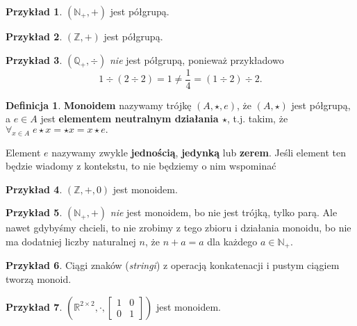 \documentclass{article}
\theoremstyle{definition}
\newtheorem{definition}{Definicja}[section]
\newtheorem{example}{Przykład}[section]
\begin{document}
\begin{example}
	$(\mathbb{N}_+, +)$ jest półgrupą.
\end{example}

\begin{example}
	$(\mathbb{Z}, +)$ jest półgrupą.
\end{example}

\begin{example}
	$(\mathbb{Q}_+, \div)$ \textit{nie} jest półgrupą, ponieważ przykładowo
	\begin{equation*}
		1 \div (2 \div 2) = 1 \neq \frac{1}{4} = (1\div2)\div2.
	\end{equation*}
\end{example}


\begin{definition}
	\textbf{Monoidem} nazywamy trójkę $(A, \star, e)$, że $(A, \star)$ jest półgrupą, a $e\in A$ jest \textbf{elementem neutralnym działania $\star$}, t.j. takim, że
	\begin{math}
		\forall_{x \in A}\; e \star x = \star x = x \star e.
	\end{math}
\end{definition}

Element $e$ nazywamy zwykle \textbf{jednością}, \textbf{jedynką} lub \textbf{zerem}.
Jeśli element ten będzie wiadomy z kontekstu,
	to nie będziemy o nim wspominać

\begin{example}
	$(\mathbb{Z}, +, 0)$ jest monoidem.
\end{example}

\begin{example}
	$(\mathbb{N}_+, +)$ \textit{nie} jest monoidem, bo nie jest trójką, tylko parą.
	Ale nawet gdybyśmy chcieli, to nie zrobimy z tego zbioru i działania monoidu, bo nie ma dodatniej liczby naturalnej $n$, że $n + a = a$ dla każdego $a \in \mathbb{N}_+$.
\end{example}

\begin{example}
	Ciągi znaków (\textit{stringi}) z operacją konkatenacji i pustym ciągiem tworzą monoid.
\end{example}

\begin{example}
	$\left(\mathbb{R}^{2 \times 2}, \cdot, \left[\begin{matrix} 1 & 0 \\ 0 & 1 \end{matrix}\right]\right)$ jest monoidem.
\end{example}
\end{document}
